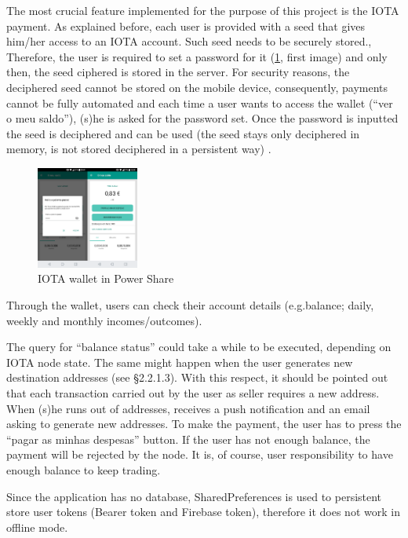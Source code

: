 The most crucial feature implemented for the purpose of this project is the IOTA payment. As explained before, each user is provided with a seed that gives him/her access to an IOTA account. Such seed needs to be securely stored.,  Therefore, the user is required to set a password for it (\cref{fig:ps11}, first image) and only then, the seed ciphered is stored in the server. For security reasons, the deciphered seed cannot be stored on the mobile device, consequently, payments cannot be fully automated and each time a user wants to access the wallet (“ver o meu saldo”), (s)he is asked for the password set. Once the password is inputted the seed is deciphered and can be used (the seed stays only deciphered in memory, is not stored deciphered in a persistent way) .


\begin{figure}[h]
\centering
\includegraphics[width=0.3\textwidth]{./Images/ps11}
\caption{IOTA wallet in Power Share}
\label{fig:ps11}
\end{figure}

Through the wallet, users can check their account details (e.g.balance; daily, weekly and monthly incomes/outcomes).



The query for “balance status” could take a while to be executed, depending on IOTA node state. The same might happen when the user generates  new destination addresses (see §2.2.1.3). With this respect, it should be pointed out that each transaction carried out by the user as seller requires a new address. When (s)he runs out of addresses, receives a push notification and an email asking to generate new addresses. To make the payment, the user has to press the “pagar as minhas despesas” button. If the user has not enough balance, the payment will be rejected by the node. It is, of course,  user responsibility to have enough balance to keep trading.


Since the application has no database, SharedPreferences is used to persistent store user tokens (Bearer token and Firebase token), therefore it does not work in offline mode. 


